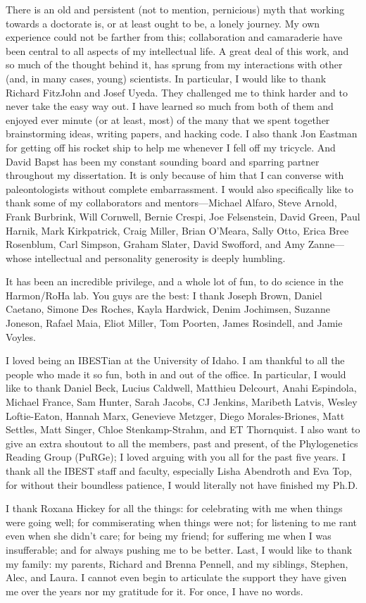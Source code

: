 There is an old and persistent (not to mention, pernicious) myth that working towards a doctorate is, or at least ought to be, a lonely journey. My own experience could not be farther from this; collaboration and camaraderie have been central to all aspects of my intellectual life. A great deal of this work, and so much of the thought behind it, has sprung from my interactions with other (and, in many cases, young) scientists. In particular, I would like to thank Richard FitzJohn and Josef Uyeda. They challenged me to think harder and to never take the easy way out. I have learned so much from both of them and enjoyed ever minute (or at least, most) of the many that we spent together brainstorming ideas, writing papers, and hacking code. I also thank Jon Eastman for getting off his rocket ship to help me whenever I fell off my tricycle. And David Bapst has been my constant sounding board and sparring partner throughout my dissertation. It is only because of him that I can converse with paleontologists without complete embarrassment. I would also specifically like to thank some of my collaborators and mentors---Michael Alfaro, Steve Arnold, Frank Burbrink, Will Cornwell, Bernie Crespi, Joe Felsenstein, David Green, Paul Harnik, Mark Kirkpatrick, Craig Miller, Brian O'Meara, Sally Otto, Erica Bree Rosenblum, Carl Simpson, Graham Slater, David Swofford, and Amy Zanne---whose intellectual and personality generosity is deeply humbling. 

It has been an incredible privilege, and a whole lot of fun, to do science in the Harmon/RoHa lab. You guys are the best: I thank Joseph Brown, Daniel Caetano, Simone Des Roches, Kayla Hardwick, Denim Jochimsen, Suzanne Joneson, Rafael Maia, Eliot Miller, Tom Poorten, James Rosindell, and Jamie Voyles.

I loved being an IBESTian at the University of Idaho. I am thankful to all the people who made it so fun, both in and out of the office. In particular, I would like to thank Daniel Beck, Lucius Caldwell, Matthieu Delcourt, Anahi Espindola, Michael France, Sam Hunter, Sarah Jacobs, CJ Jenkins, Maribeth Latvis, Wesley Loftie-Eaton, Hannah Marx, Genevieve Metzger, Diego Morales-Briones, Matt Settles, Matt Singer, Chloe Stenkamp-Strahm, and ET Thornquist. I also want to give an extra shoutout to all the members, past and present, of the Phylogenetics Reading Group (PuRGe); I loved arguing with you all for the past five years. I thank all the IBEST staff and faculty, especially Lisha Abendroth and Eva Top, for without their boundless patience, I would literally not have finished my Ph.D.

I thank Roxana Hickey for all the things: for celebrating with me when things were going well; for commiserating when things were not; for listening to me rant even when she didn't care; for being my friend; for suffering me when I was insufferable; and for always pushing me to be better. Last, I would like to thank my family: my parents, Richard and Brenna Pennell, and my siblings, Stephen, Alec, and Laura. I cannot even begin to articulate the support they have given me over the years nor my gratitude for it. For once, I have no words.


